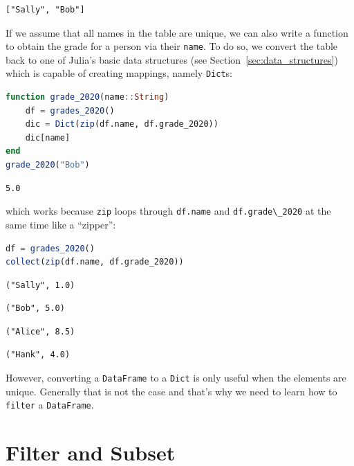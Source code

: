 \documentclass[
  notoc %
]{tufte-book}
\newcommand{\passthrough}[1]{#1}
\begin{document}
\begin{lstlisting}[language=Output]
["Sally", "Bob"]
\end{lstlisting}

If we assume that all names in the table are unique, we can also write a
function to obtain the grade for a person via their
\passthrough{\lstinline!name!}. To do so, we convert the table back to
one of Julia's basic data structures (see
Section~\ref{sec:data_structures}) which is capable of creating
mappings, namely \passthrough{\lstinline!Dict!}s:

\begin{lstlisting}[language=Julia]
function grade_2020(name::String)
    df = grades_2020()
    dic = Dict(zip(df.name, df.grade_2020))
    dic[name]
end
grade_2020("Bob")
\end{lstlisting}

\begin{lstlisting}[language=Output]
5.0
\end{lstlisting}

which works because \passthrough{\lstinline!zip!} loops through
\passthrough{\lstinline!df.name!} and
\passthrough{\lstinline!df.grade\_2020!} at the same time like a
``zipper'':

\begin{lstlisting}[language=Julia]
df = grades_2020()
collect(zip(df.name, df.grade_2020))
\end{lstlisting}

\begin{lstlisting}[language=Output]
("Sally", 1.0)
\end{lstlisting}

\begin{lstlisting}[language=Output]
("Bob", 5.0)
\end{lstlisting}

\begin{lstlisting}[language=Output]
("Alice", 8.5)
\end{lstlisting}

\begin{lstlisting}[language=Output]
("Hank", 4.0)
\end{lstlisting}

However, converting a \passthrough{\lstinline!DataFrame!} to a
\passthrough{\lstinline!Dict!} is only useful when the elements are
unique. Generally that is not the case and that's why we need to learn
how to \passthrough{\lstinline!filter!} a
\passthrough{\lstinline!DataFrame!}.

\hypertarget{sec:filter_subset}{%
\section{Filter and Subset}\label{sec:filter_subset}}
\end{document}
